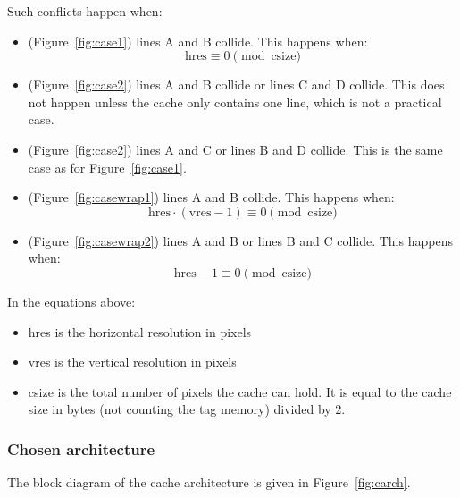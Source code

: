 \documentclass[a4paper,11pt]{article}
\begin{document}
Such conflicts happen when:
\begin{itemize}
\item (Figure~\ref{fig:case1}) lines A and B collide. This happens when:
\begin{equation*}
\text{hres} \equiv 0 \pmod{\text{csize}}
\end{equation*}
\item (Figure~\ref{fig:case2}) lines A and B collide or lines C and D collide. This does not happen unless the cache only contains one line, which is not a practical case.
\item (Figure~\ref{fig:case2}) lines A and C or lines B and D collide. This is the same case as for Figure~\ref{fig:case1}.
\item (Figure~\ref{fig:casewrap1}) lines A and B collide. This happens when:
\begin{equation*}
\text{hres}\cdot(\text{vres}-1) \equiv 0 \pmod{\text{csize}}
\end{equation*}
\item (Figure~\ref{fig:casewrap2}) lines A and B or lines B and C collide. This happens when:
\begin{equation*}
\text{hres}-1 \equiv 0 \pmod{\text{csize}}
\end{equation*}
\end{itemize}

In the equations above:
\begin{itemize}
\item hres is the horizontal resolution in pixels
\item vres is the vertical resolution in pixels
\item csize is the total number of pixels the cache can hold. It is equal to the cache size in bytes (not counting the tag memory) divided by 2.
\end{itemize}

\subsubsection{Chosen architecture}
The block diagram of the cache architecture is given in Figure~\ref{fig:carch}.
\end{document}
